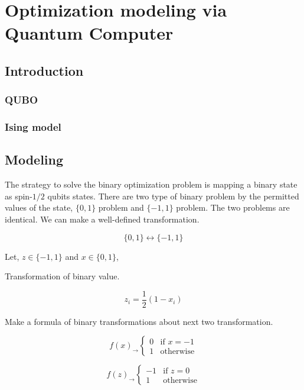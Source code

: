 \chapter{Optimization modeling via Quantum Computer}

\section{Introduction}


\subsection{QUBO}


\subsection{Ising model}

\section{Modeling}

The strategy to solve the binary optimization problem
is mapping a binary state as spin-$1/2$ qubits states.
There are two type of binary problem by the permitted values
of the state, $\{0, 1\}$ problem and $\{-1, 1\}$ problem.
The two problems are identical.
We can make a well-defined transformation.

\begin{equation}
    \{0, 1\} \leftrightarrow \{-1, 1\}
\end{equation}

Let, $z \in \{-1, 1\}$ and $x \in \{0, 1\}$, 

\begin{example} Transformation of binary value.

    \begin{equation*}
        z_i = \frac{1}{2}(1- x_i)
    \end{equation*}
\end{example}

\begin{exercise}
    
    Make a formula of binary transformations about next two transformation.

    \begin{equation*}
        f(x)_{\rightarrow} \begin{cases}
            0 & \mbox{if } x=-1 \\
            1 & \mbox{otherwise}
        \end{cases}
    \end{equation*}

    \begin{equation*}
        f(z)_{\rightarrow} \begin{cases}
            -1 & \mbox{if } z=0 \\
            1 & \mbox{otherwise}
        \end{cases}
    \end{equation*}
\end{exercise}



